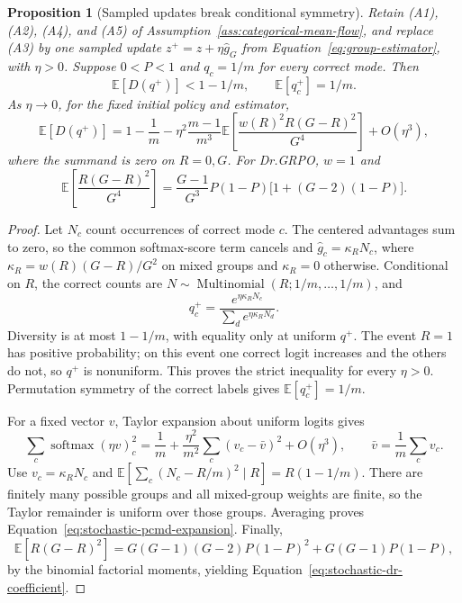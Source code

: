 \documentclass{article}
\newcommand{\enforcehalffinalproseline}{%
  \setlength{\parfillskip}{0pt plus .20\linewidth}}
\newcommand{\1}{\mathbf 1}
\newcommand{\E}{\mathbb E}
\newtheorem{proposition}[lemma]{Proposition}
\theoremstyle{remark}
\theoremstyle{definition}
\theoremstyle{plain}
\begin{document}
\begin{proposition}[Sampled updates break conditional symmetry]
\enforcehalffinalproseline
\label{prop:stochastic-pcmd}
Retain (A1), (A2), (A4), and (A5) of
Assumption~\ref{ass:categorical-mean-flow}, and replace (A3) by one sampled
update $z^+=z+\eta\widehat g_G$ from
Equation~\eqref{eq:group-estimator}, with $\eta>0$. Suppose $0<P<1$ and $q_c=1/m$ for every correct mode. Then
\begin{equation}
 \E[D(q^+)]<1-1/m,
 \qquad \E[q_c^+]=1/m.
 \label{eq:stochastic-strict-decrease}
\end{equation}
As $\eta\to0$, for the fixed initial policy and estimator,
\begin{equation}
 \E[D(q^+)]
 =1-\frac1m
  -\eta^2\frac{m-1}{m^3}
    \E\!\left[\frac{w(R)^2R(G-R)^2}{G^4}\right]
  +O(\eta^3),
 \label{eq:stochastic-pcmd-expansion}
\end{equation}
where the summand is zero on $R=0,G$. For Dr.GRPO, $w=1$ and
\begin{equation}
 \E\!\left[\frac{R(G-R)^2}{G^4}\right]
 =\frac{G-1}{G^3}P(1-P)\big[1+(G-2)(1-P)\big].
 \label{eq:stochastic-dr-coefficient}
\end{equation}
\end{proposition}

\begin{proof}
\enforcehalffinalproseline
Let $N_c$ count occurrences of correct mode $c$. The centered advantages
sum to zero, so the common softmax-score term cancels and
$\widehat g_c=\kappa_RN_c$, where
$\kappa_R=w(R)(G-R)/G^2$ on mixed groups and $\kappa_R=0$ otherwise.
Conditional on $R$, the correct counts are
$N\sim\operatorname{Multinomial}(R;1/m,\ldots,1/m)$, and
\[
 q_c^+=\frac{e^{\eta\kappa_RN_c}}{\sum_de^{\eta\kappa_RN_d}}.
\]
Diversity is at most $1-1/m$, with equality only at uniform $q^+$.
The event $R=1$ has positive probability; on this event one correct logit
increases and the others do not, so $q^+$ is nonuniform. This proves the
strict inequality for every $\eta>0$. Permutation symmetry of the correct
labels gives $\E[q_c^+]=1/m$.

For a fixed vector $v$, Taylor expansion about uniform logits gives
\[
 \sum_c\operatorname{softmax}(\eta v)_c^2
 =\frac1m+\frac{\eta^2}{m^2}\sum_c(v_c-\bar v)^2+O(\eta^3),
 \qquad \bar v=\frac1m\sum_cv_c.
\]
Use $v_c=\kappa_RN_c$ and
$\E[\sum_c(N_c-R/m)^2\mid R]=R(1-1/m)$.
There are finitely many possible groups and all mixed-group weights are
finite, so the Taylor remainder is uniform over those groups. Averaging
proves Equation~\eqref{eq:stochastic-pcmd-expansion}.
Finally,
\[
 \E[R(G-R)^2]
 =G(G-1)(G-2)P(1-P)^2+G(G-1)P(1-P),
\]
by the binomial factorial moments, yielding
Equation~\eqref{eq:stochastic-dr-coefficient}.
\end{proof}
\end{document}
